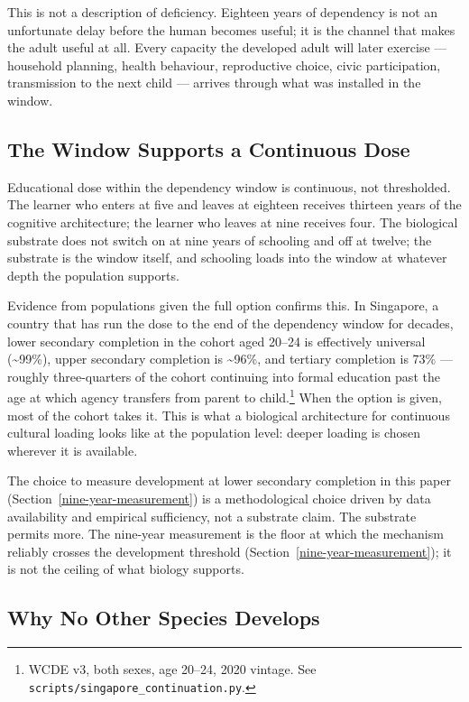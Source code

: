 \documentclass[12pt,letterpaper]{article}
\begin{document}
This is not a description of deficiency. Eighteen years of
dependency is not an unfortunate delay before the human becomes
useful; it is the channel that makes the adult useful at all. Every
capacity the developed adult will later exercise --- household
planning, health behaviour, reproductive choice, civic participation,
transmission to the next child --- arrives through what was installed
in the window.

\subsection{The Window Supports a Continuous Dose}\label{the-window-supports-a-continuous-dose}

Educational dose within the dependency window is continuous, not
thresholded. The learner who enters at five and leaves at eighteen
receives thirteen years of the cognitive architecture; the learner
who leaves at nine receives four. The biological substrate does not
switch on at nine years of schooling and off at twelve; the substrate
is the window itself, and schooling loads into the window at whatever
depth the population supports.

Evidence from populations given the full option confirms this. In
Singapore, a country that has run the dose to the end of the
dependency window for decades, lower secondary completion in the
cohort aged 20--24 is effectively universal (\textasciitilde 99\%),
upper secondary completion is \textasciitilde 96\%, and tertiary
completion is 73\% --- roughly three-quarters of the cohort
continuing into formal education past the age at which agency
transfers from parent to child.\footnote{WCDE v3, both sexes, age
20--24, 2020 vintage. See \nolinkurl{scripts/singapore_continuation.py}.}
When the option is given, most of the cohort takes it. This is what a
biological architecture for continuous cultural loading looks like at
the population level: deeper loading is chosen wherever it is
available.

The choice to measure development at lower secondary completion in
this paper (Section~\ref{nine-year-measurement}) is
a methodological choice driven by data availability and empirical
sufficiency, not a substrate claim. The substrate permits more. The
nine-year measurement is the floor at which the mechanism reliably
crosses the development threshold
(Section~\ref{nine-year-measurement}); it is not the ceiling of what
biology supports.

\subsection{Why No Other Species Develops}\label{why-no-other-species-develops}
\end{document}

